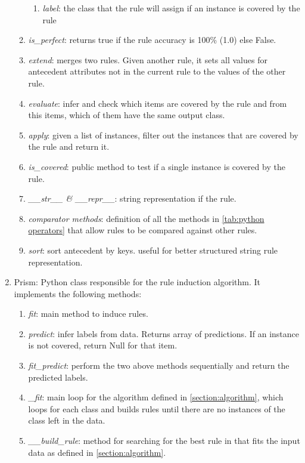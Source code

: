 \begin{enumerate}
\begin{enumerate}
\begin{enumerate}
                    \item \emph{label}: the class that the rule will assign if an instance is covered by the rule
                \end{enumerate}
            \item \emph{is\_perfect}: returns true if the rule accuracy is 100\% (1.0) else False.
            \item \emph{extend}: merges two rules. Given another rule, it sets all values for antecedent attributes not in the current rule to the values of the other rule.
            \item \emph{evaluate}: infer and check which items are covered by the rule and from this items, which of them have the same output class.
            \item \emph{apply}: given a list of instances, filter out the instances that are covered by the rule and return it.
            \item \emph{is\_covered}: public method to test if a single instance is covered by the rule.
            \item \emph{\_\_str\_\_ \& \_\_repr\_\_}: string representation if the rule.
            \item \emph{comparator methods}: definition of all the methods in \ref{tab:python operators} that allow rules to be compared against other rules.
            \item \emph{sort}: sort antecedent by keys. useful for better structured string rule representation.
        \end{enumerate}
    \item Prism: Python class responsible for the rule induction algorithm. It implements the following methods:
        \begin{enumerate}
            \item \emph{fit}: main method to induce rules.
            \item \emph{predict}: infer labels from data. Returns array of predictions. If an instance is not covered, return Null for that item.
            \item \emph{fit\_predict}: perform the two above methods sequentially and return the predicted labels.
            \item \emph{\_fit}: main loop for the algorithm defined in \ref{section:algorithm}, which loops for each class and builds rules until there are no instances of the class left in the data.
            \item \emph{\_\_build\_rule}: method for searching for the best rule in that fits the input data as defined in \ref{section:algorithm}.

\end{enumerate}
\end{enumerate}
